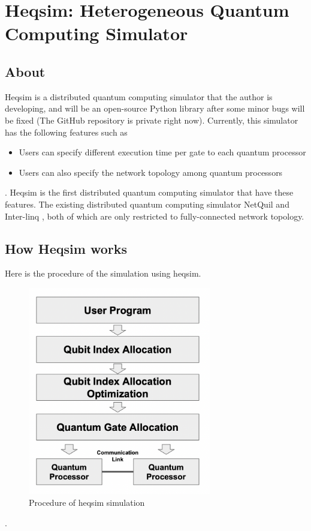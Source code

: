 \chapter{Heqsim: Heterogeneous Quantum Computing Simulator}

\section{About}

Heqsim is a distributed quantum computing simulator that the author is developing, and will be an open-source Python library after some minor bugs will be fixed (The GitHub repository is private right now).  Currently, this simulator has the following features such as 

\begin{itemize}
      \item Users can specify different execution time per gate to each quantum processor
      \item Users can also specify the network topology among quantum processors 
\end{itemize}
.
Heqsim is the first distributed quantum computing simulator that have these features.  The existing distributed quantum computing simulator NetQuil \cite{netquil} and Inter-linq \cite{parekh} , both of which are only restricted to fully-connected network topology.

\newpage

\section{How Heqsim works}

Here is the procedure of the simulation using heqsim.

\begin{figure}[h]
  		\begin{center}
  			\includegraphics[width=8cm]{img/procedure.png}
			\caption{Procedure of heqsim simulation}
		\end{center}
\end{figure}.

